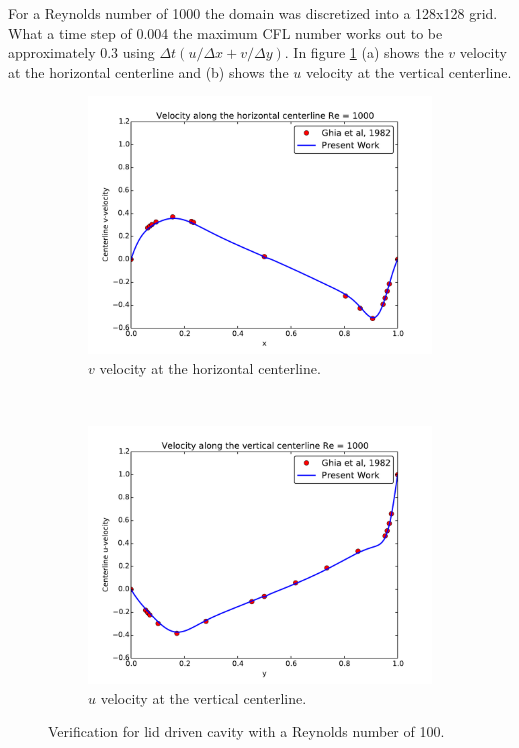 \documentclass[onehalf,11pt]{beavtex}
\begin{document}
For a Reynolds number of 1000 the domain was discretized into a 128x128 grid. 
What a time step of 0.004 the maximum CFL number works out to be approximately 0.3 using $\Delta t(u/\Delta x+v/\Delta y)$.
In figure \ref{fig:ldc1000} (a) shows the $v$ velocity at the horizontal centerline and (b) shows the $u$ velocity at the vertical centerline. 
\begin{figure}[htb]
	\centering
	\begin{subfigure}{0.4\textwidth}
		\includegraphics[width=\linewidth]{ldc_horizontal_1000}
		\caption{$v$ velocity at the horizontal centerline.}		
	\end{subfigure}
	~
	\begin{subfigure}{0.4\textwidth}
		\includegraphics[width=\linewidth]{ldc_vertical_1000}
		\caption{$u$ velocity at the vertical centerline.}		
	\end{subfigure}
	\caption{Verification for lid driven cavity with a Reynolds number of 100.}
	\label{fig:ldc1000}
\end{figure}
\end{document}
